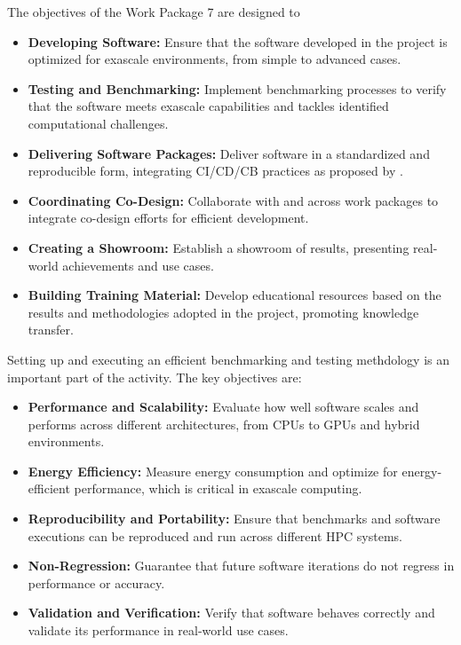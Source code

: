 The objectives of the Work Package 7 are designed to 
\begin{itemize}
    \item \textbf{Developing Software:} Ensure that the software developed in the \exama project is optimized for exascale environments, from simple to advanced cases.
    \item \textbf{Testing and Benchmarking:} Implement benchmarking processes to verify that the software meets exascale capabilities and tackles identified computational challenges.
    \item \textbf{Delivering Software Packages:} Deliver software in a standardized and reproducible form, integrating CI/CD/CB practices as proposed by \exadi.
    \item \textbf{Coordinating Co-Design:} Collaborate with \exadi and across \exama work packages to integrate co-design efforts for efficient development.
    \item \textbf{Creating a Showroom:} Establish a showroom of \exama results, presenting real-world achievements and use cases.
    \item \textbf{Building Training Material:} Develop educational resources based on the results and methodologies adopted in the \exama project, promoting knowledge transfer.
\end{itemize}
Setting up and executing an efficient benchmarking and testing methdology is an important part of the activity. 
The key objectives are:
\begin{itemize}
    \item \textbf{Performance and Scalability:} Evaluate how well software scales and performs across different architectures, from CPUs to GPUs and hybrid environments.
    \item \textbf{Energy Efficiency:} Measure energy consumption and optimize for energy-efficient performance, which is critical in exascale computing.
    \item \textbf{Reproducibility and Portability:} Ensure that benchmarks and software executions can be reproduced and run across different HPC systems.
    \item \textbf{Non-Regression:} Guarantee that future software iterations do not regress in performance or accuracy.
    \item \textbf{Validation and Verification:} Verify that software behaves correctly and validate its performance in real-world use cases.
\end{itemize}

